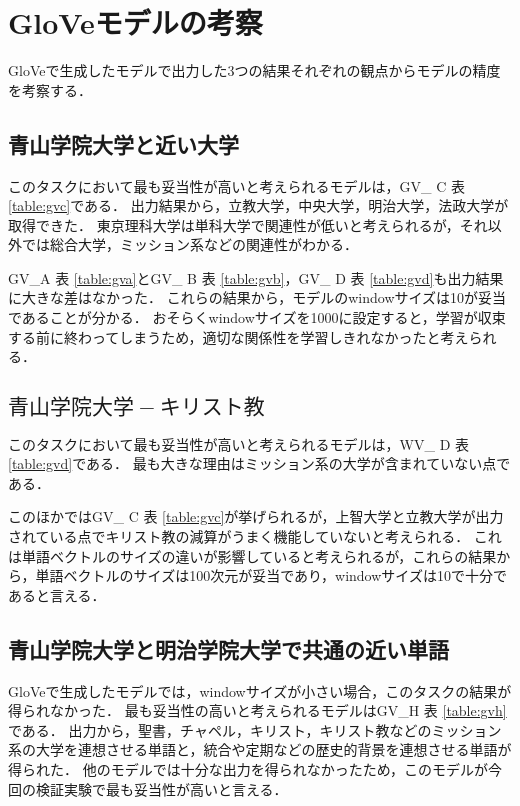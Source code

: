 \section{GloVeモデルの考察}
GloVeで生成したモデルで出力した3つの結果それぞれの観点からモデルの精度を考察する．

\subsection{青山学院大学と近い大学}
このタスクにおいて最も妥当性が高いと考えられるモデルは，GV\_ C 表 \ref{table:gvc}である．
出力結果から，立教大学，中央大学，明治大学，法政大学が取得できた．
東京理科大学は単科大学で関連性が低いと考えられるが，それ以外では総合大学，ミッション系などの関連性がわかる．

GV\_A 表 \ref{table:gva}とGV\_ B 表 \ref{table:gvb}，GV\_ D 表 \ref{table:gvd}も出力結果に大きな差はなかった．
これらの結果から，モデルのwindowサイズは10が妥当であることが分かる．
おそらくwindowサイズを1000に設定すると，学習が収束する前に終わってしまうため，適切な関係性を学習しきれなかったと考えられる．

\subsection{$ 青山学院大学 - キリスト教 $}
このタスクにおいて最も妥当性が高いと考えられるモデルは，WV\_ D 表 \ref{table:gvd}である．
最も大きな理由はミッション系の大学が含まれていない点である．

このほかではGV\_ C 表 \ref{table:gvc}が挙げられるが，上智大学と立教大学が出力されている点でキリスト教の減算がうまく機能していないと考えられる．
これは単語ベクトルのサイズの違いが影響していると考えられるが，これらの結果から，単語ベクトルのサイズは100次元が妥当であり，windowサイズは10で十分であると言える．

\subsection{青山学院大学と明治学院大学で共通の近い単語}
GloVeで生成したモデルでは，windowサイズが小さい場合，このタスクの結果が得られなかった．
最も妥当性の高いと考えられるモデルはGV\_H 表 \ref{table:gvh}である．
出力から，聖書，チャペル，キリスト，キリスト教などのミッション系の大学を連想させる単語と，統合や定期などの歴史的背景を連想させる単語が得られた．
他のモデルでは十分な出力を得られなかったため，このモデルが今回の検証実験で最も妥当性が高いと言える．
